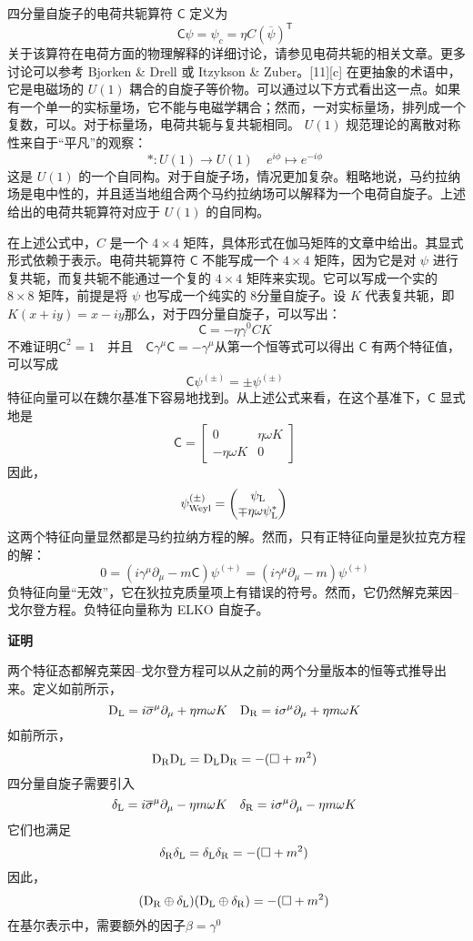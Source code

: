 四分量自旋子的电荷共轭算符 \(\mathsf{C}\) 定义为
\[
\mathsf{C} \psi = \psi_{c} = \eta C \left( \overline{\psi} \right)^{\textsf{T}}~
\]
关于该算符在电荷方面的物理解释的详细讨论，请参见电荷共轭的相关文章。更多讨论可以参考 Bjorken & Drell 或 Itzykson & Zuber。[11][c] 在更抽象的术语中，它是电磁场的 \( U(1) \) 耦合的自旋子等价物。可以通过以下方式看出这一点。如果有一个单一的实标量场，它不能与电磁学耦合；然而，一对实标量场，排列成一个复数，可以。对于标量场，电荷共轭与复共轭相同。 \( U(1) \) 规范理论的离散对称性来自于“平凡”的观察：
\[
*: U(1) \to U(1) \quad e^{i\phi} \mapsto e^{-i\phi}~
\]
这是 \( U(1) \) 的一个自同构。对于自旋子场，情况更加复杂。粗略地说，马约拉纳场是电中性的，并且适当地组合两个马约拉纳场可以解释为一个电荷自旋子。上述给出的电荷共轭算符对应于 \( U(1) \) 的自同构。

在上述公式中，\( C \) 是一个 \( 4 \times 4 \) 矩阵，具体形式在伽马矩阵的文章中给出。其显式形式依赖于表示。电荷共轭算符 \(\mathsf{C}\) 不能写成一个 \( 4 \times 4 \) 矩阵，因为它是对 \(\psi\) 进行复共轭，而复共轭不能通过一个复的 \( 4 \times 4 \) 矩阵来实现。它可以写成一个实的 \( 8 \times 8 \) 矩阵，前提是将 \(\psi\) 也写成一个纯实的 8分量自旋子。设 \( K \) 代表复共轭，即\(K(x + iy) = x - iy\)那么，对于四分量自旋子，可以写出：
\[
\mathsf{C} = -\eta \gamma^0 C K~
\]
不难证明\(\mathsf{C}^2 = 1 \quad \text{并且} \quad \mathsf{C} \gamma^{\mu} \mathsf{C} = -\gamma^{\mu}\)从第一个恒等式可以得出 \(\mathsf{C}\) 有两个特征值，可以写成
\[
\mathsf{C} \psi^{(\pm)} = \pm \psi^{(\pm)}~
\]
特征向量可以在魏尔基准下容易地找到。从上述公式来看，在这个基准下，\(\mathsf{C}\) 显式地是
\[
\mathsf{C} = \begin{bmatrix} 0 & \eta \omega K \\ -\eta \omega K & 0 \end{bmatrix}~
\]
因此，
\[
\psi_{\text{Weyl}}^{(\pm)} = \begin{pmatrix} \psi_{\rm{L}} \\ \mp \eta \omega \psi_{\rm{L}}^{*} \end{pmatrix}~
\]
这两个特征向量显然都是马约拉纳方程的解。然而，只有正特征向量是狄拉克方程的解：
\[
0 = \left( i \gamma^{\mu} \partial_{\mu} - m \mathsf{C} \right) \psi^{(+)} = \left( i \gamma^{\mu} \partial_{\mu} - m \right) \psi^{(+)}~
\]
负特征向量“无效”，它在狄拉克质量项上有错误的符号。然而，它仍然解克莱因–戈尔登方程。负特征向量称为 ELKO 自旋子。

\textbf{证明}  

两个特征态都解克莱因–戈尔登方程可以从之前的两个分量版本的恒等式推导出来。定义如前所示，
\[
\mathrm{D}_{\rm{L}} = i\overline{\sigma}^{\mu}\partial_{\mu} + \eta m \omega K \quad \mathrm{D}_{\rm{R}} = i\sigma^{\mu}\partial_{\mu} + \eta m \omega K~
\]
如前所示，
\[
\mathrm{D}_{\rm{R}}\mathrm{D}_{\rm{L}} = \mathrm{D}_{\rm{L}}\mathrm{D}_{\rm{R}} = -(\square + m^2)~
\]
四分量自旋子需要引入
\[
\delta_{\rm{L}} = i\overline{\sigma}^{\mu} \partial_{\mu} - \eta m \omega K \quad \delta_{\rm{R}} = i \sigma^{\mu} \partial_{\mu} - \eta m \omega K~
\]
它们也满足
\[
\delta_{\rm{R}} \delta_{\rm{L}} = \delta_{\rm{L}} \delta_{\rm{R}} = -(\square + m^2)~
\]
因此，
\[
(\mathrm{D}_{\rm{R}} \oplus \delta_{\rm{L}})(\mathrm{D}_{\rm{L}} \oplus \delta_{\rm{R}}) = -(\square + m^2)~
\]
在基尔表示中，需要额外的因子\(\beta = \gamma^0\)

